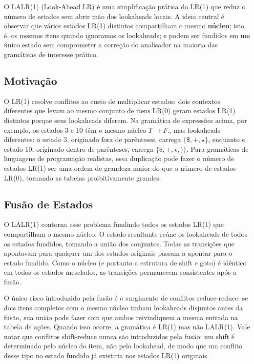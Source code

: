 O LALR(1) (Look-Ahead LR) é uma simplificação prática do LR(1) que
reduz o número de estados sem abrir mão dos lookaheads locais. A
ideia central é observar que vários estados LR(1) distintos
compartilham o mesmo \textbf{núcleo}; isto é, os mesmos itens
quando ignoramos os lookaheads; e podem ser fundidos em um único
estado sem comprometer a correção do analisador na maioria das
gramáticas de interesse prático.

\subsection{Motivação}

O LR(1) resolve conflitos ao custo de multiplicar estados: dois
contextos diferentes que levam ao mesmo conjunto de itens LR(0) geram
estados LR(1) distintos porque seus lookaheads diferem. Na gramática
de expressões acima, por exemplo, os estados 3 e 10 têm o mesmo
núcleo \(T \to F .\), mas lookaheads diferentes: o estado 3,
originado fora de parênteses, carrega \(\{\$, +, \star\}\), enquanto
o estado 10, originado dentro de parênteses, carrega \(\{\$, +,
\star, )\}\). Para gramáticas de linguagens de programação realistas,
essa duplicação pode fazer o número de estados LR(1) ser uma ordem de
grandeza maior do que o número de estados LR(0), tornando as tabelas
proibitivamente grandes.

\subsection{Fusão de Estados}

O LALR(1) contorna esse problema fundindo todos os estados LR(1) que
compartilham o mesmo núcleo. O estado resultante reúne os lookaheads
de todos os estados fundidos, tomando a união dos conjuntos. Todas as
transições que apontavam para qualquer um dos estados originais
passam a apontar para o estado fundido. Como o núcleo (e portanto
a estrutura de shift e goto) é idêntico em todos os estados
mesclados, as transições permanecem consistentes após a fusão.

O único risco introduzido pela fusão é o surgimento de conflitos
reduce-reduce: se dois itens completos com o mesmo núcleo tinham
lookaheads disjuntos antes da fusão, sua união pode fazer com que
ambos reivindiquem a mesma entrada na tabela de ações. Quando isso
ocorre, a gramática é LR(1) mas não LALR(1). Vale notar que conflitos
shift-reduce nunca são introduzidos pela fusão: um shift é
determinado pelo núcleo do item, não pelo lookahead, de modo que um
conflito desse tipo no estado fundido já existiria nos estados LR(1) originais.

